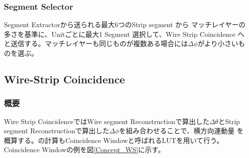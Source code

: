 \subsubsection*{Segment Selector}
Segment Extractorから送られる最大6つのStrip segment から マッチレイヤーの多さを基準に、Unitごとに最大1 Segment 選択して、Wire Strip Coincidence へと送信する。マッチレイヤーも同じものが複数ある場合には$\Delta\phi$がより小さいものを選ぶ。

\subsection{Wire-Strip Coincidence}
\subsubsection*{概要}
Wire Strip CoincidenceではWire segment Reconstructionで算出した$\Delta\theta$とStrip segment Reconstructionで算出した$\Delta\phi$を組み合わせることで、横方向運動量 \pt を概算する。\pt の計算もCoincidence Windowと呼ばれるLUTを用いて行う。Coincidence Windowの例を図\ref{Concept_WS}に示す。

